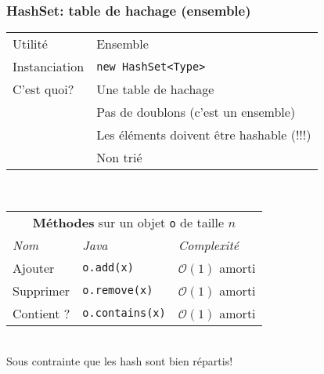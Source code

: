 \documentclass[8pt,aspectratio=169]{beamer}
\begin{document}
\begin{frame}
\frametitle{HashSet: table de hachage (ensemble)}
\centering
\begin{tabular}{ll}
	Utilité & Ensemble\\
	Instanciation & \texttt{new HashSet<Type>}\\
	C'est quoi? & Une table de hachage\\
	& \color{red} Pas de doublons (c'est un ensemble)\\
	& \color{red} Les éléments doivent être hashable (!!!)\\
	& \color{red} Non trié
	
\end{tabular}\\
\vspace{0.5cm}
\centering
\begin{tabular}{lll}
	\multicolumn{3}{c}{\textbf{Méthodes} sur un objet \texttt{o} de taille $n$} \\
	\textit{Nom} & \textit{Java} & \textit{Complexité} \\
	Ajouter & \texttt{o.add(x)} & $\mathcal{O}(1)$ \color{orange} amorti\\
	Supprimer & \texttt{o.remove(x)} & $\mathcal{O}(1)$ \color{orange} amorti\\
	Contient ? & \texttt{o.contains(x)} & $\mathcal{O}(1)$ \color{orange} amorti\\
\end{tabular}\\
\vspace{0.5cm}
\color{blue} Sous contrainte que les hash sont bien répartis!
\end{frame}
\end{document}
